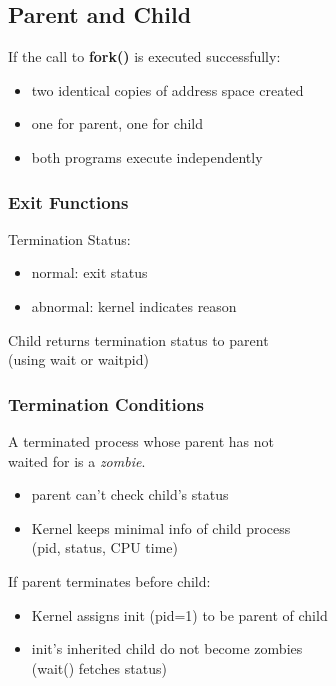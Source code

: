 \documentclass[10pt]{article}
\begin{document}
\footnotesize
\begin{multicols}{2}
    \begin{minipage}{\columnwidth}
        \normalsize
        \subsection*{Parent and Child}
        If the call to \textbf{fork()} is executed successfully:
        \begin{itemize}
            \item two identical copies of address space created
            \item one for parent, one for child
            \item both programs execute independently
        \end{itemize}
        \subsubsection*{Exit Functions}
        Termination Status:
        \begin{itemize}
            \item normal: exit status
            \item abnormal: kernel indicates reason
        \end{itemize}
        Child returns termination status to parent \\
        (using wait or waitpid)
        \subsubsection*{Termination Conditions}
        A terminated process whose parent has not \\
        waited for is a \textit{zombie}.
        \begin{itemize}
            \item parent can't check child's status
            \item Kernel keeps minimal info of child process \\
                  (pid, status, CPU time)
        \end{itemize}
        If parent terminates before child:
        \begin{itemize}
            \item Kernel assigns init (pid=1) to be parent of child
            \item init's inherited child do not become zombies\\
                  (wait() fetches status)
        \end{itemize}

\end{minipage}
\end{multicols}
\end{document}
